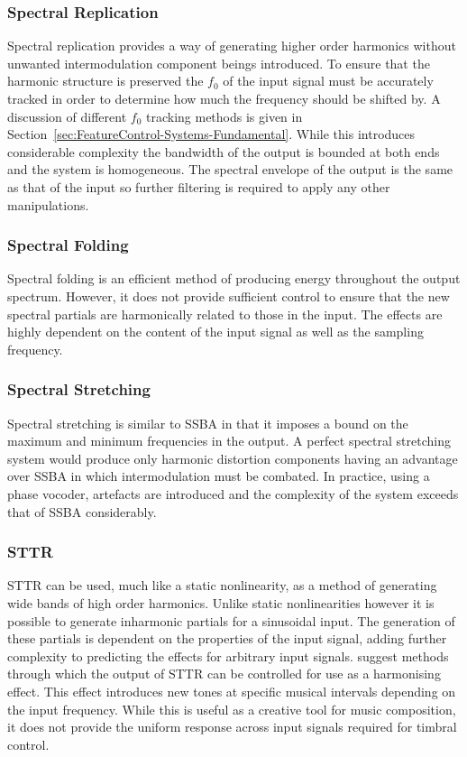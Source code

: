 		\subsubsection*{Spectral Replication}
			Spectral replication provides a way of generating higher order harmonics without unwanted
			intermodulation component beings introduced. To ensure that the harmonic structure is preserved the
			$f_{0}$ of the input signal must be accurately tracked in order to determine how much the frequency
			should be shifted by. A discussion of different $f_{0}$ tracking methods is given in
			Section~\ref{sec:FeatureControl-Systems-Fundamental}. While this introduces considerable complexity
			the bandwidth of the output is bounded at both ends and the system is homogeneous. The spectral
			envelope of the output is the same as that of the input so further filtering is required to apply
			any other manipulations.

		\subsubsection*{Spectral Folding}
			Spectral folding is an efficient method of producing energy throughout the output spectrum.
			However, it does not provide sufficient control to ensure that the new spectral partials are
			harmonically related to those in the input. The effects are highly dependent on the content of the
			input signal as well as the sampling frequency.

		\subsubsection*{Spectral Stretching}
			Spectral stretching is similar to SSBA in that it imposes a bound on the maximum and minimum
			frequencies in the output. A perfect spectral stretching system would produce only harmonic
			distortion components having an advantage over SSBA in which intermodulation must be combated. In
			practice, using a phase vocoder, artefacts are introduced and the complexity of the system exceeds
			that of SSBA considerably.

		\subsubsection*{STTR}
			STTR can be used, much like a static nonlinearity, as a method of generating wide bands of high
			order harmonics. Unlike static nonlinearities however it is possible to generate inharmonic
			partials for a sinusoidal input. The generation of these partials is dependent on the properties of
			the input signal, adding further complexity to predicting the effects for arbitrary input signals.
			\citet{kim2015harmonizing} suggest methods through which the output of STTR can be controlled for
			use as a harmonising effect. This effect introduces new tones at specific musical intervals
			depending on the input frequency. While this is useful as a creative tool for music composition, it
			does not provide the uniform response across input signals required for timbral control.

